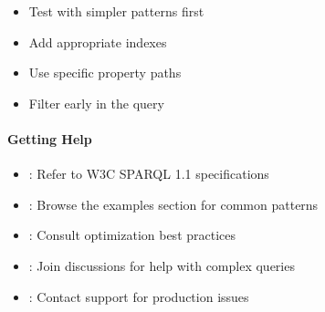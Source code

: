\documentclass[letterpaper,10pt,english]{sphinxmanual}
\begin{document}
\begin{description}
\begin{itemize}
\item {} 
\sphinxAtStartPar
Test with simpler patterns first

\end{itemize}

\begin{itemize}
\item {} 
\sphinxAtStartPar
Add appropriate indexes

\item {} 
\sphinxAtStartPar
Use specific property paths

\item {} 
\sphinxAtStartPar
Filter early in the query

\end{itemize}

\end{description}


\paragraph{Getting Help}
\label{\detokenize{api/sparql-api:getting-help}}\begin{itemize}
\item {} 
\sphinxAtStartPar
{}: Refer to W3C SPARQL 1.1 specifications

\item {} 
\sphinxAtStartPar
{}: Browse the examples section for common patterns

\item {} 
\sphinxAtStartPar
{}: Consult optimization best practices

\item {} 
\sphinxAtStartPar
{}: Join discussions for help with complex queries

\item {} 
\sphinxAtStartPar
{}: Contact support for production issues

\end{itemize}
\end{document}
